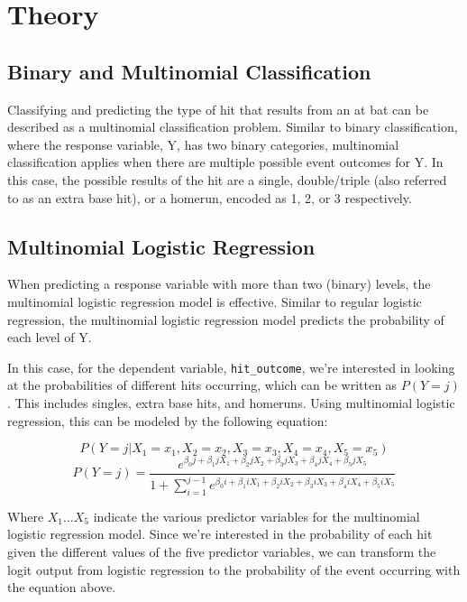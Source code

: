 \documentclass[
  letterpaper,
  DIV=11,
  numbers=noendperiod]{scrartcl}
\begin{document}
\section{Theory}\label{theory}

\subsection{Binary and Multinomial
Classification}\label{binary-and-multinomial-classification}

Classifying and predicting the type of hit that results from an at bat
can be described as a multinomial classification problem. Similar to
binary classification, where the response variable, Y, has two binary
categories, multinomial classification applies when there are multiple
possible event outcomes for Y. In this case, the possible results of the
hit are a single, double/triple (also referred to as an extra base hit),
or a homerun, encoded as 1, 2, or 3 respectively.

\subsection{Multinomial Logistic
Regression}\label{multinomial-logistic-regression}

When predicting a response variable with more than two (binary) levels,
the multinomial logistic regression model is effective. Similar to
regular logistic regression, the multinomial logistic regression model
predicts the probability of each level of Y.

In this case, for the dependent variable, \texttt{hit\_outcome}, we're
interested in looking at the probabilities of different hits occurring,
which can be written as \(P(Y=j)\). This includes singles, extra base
hits, and homeruns. Using multinomial logistic regression, this can be
modeled by the following equation:

\[P(Y=j | X_1 = x_1, X_2 = x_2, X_3 = x_3, X_4 = x_4, X_5 = x_5)\]
\[P(Y=j) = 
\frac{e^{\beta_0j + \beta_1jX_1 + \beta_2jX_2 + \beta_3jX_3 + \beta_4jX_4 + \beta_5jX_5}}{1 + \sum_{i = 1}^{j-1}{e^{\beta_0i + \beta_1iX_1 + \beta_2iX_2 + \beta_3iX_3 + \beta_4iX_4 + \beta_5iX_5}}}\]

Where \(X_1 ... X_5\) indicate the various predictor variables for the
multinomial logistic regression model. Since we're interested in the
probability of each hit given the different values of the five predictor
variables, we can transform the logit output from logistic regression to
the probability of the event occurring with the equation above.
\end{document}
